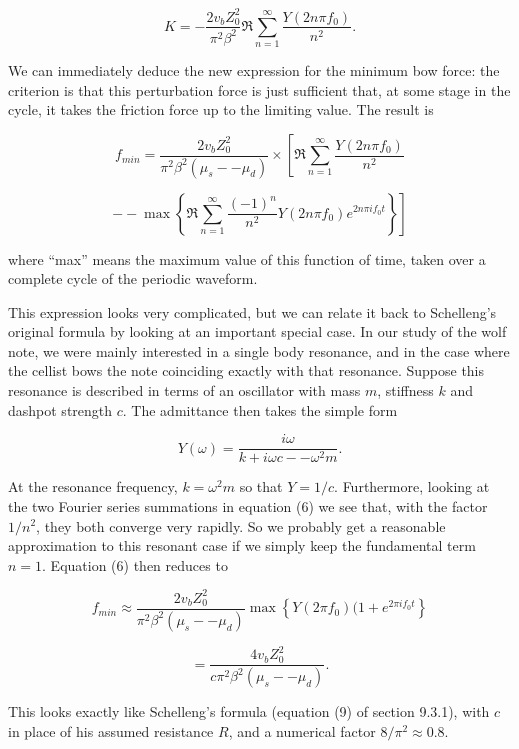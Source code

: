   \begin{equation*}K=-\dfrac{2 v_b Z^2_0}{\pi^2 \beta^2}\Re 
  \sum_{n=1}^\infty{\dfrac{Y(2 n \pi f_0)}{n^2} } . \tag{5}\end{equation*} 

  We can immediately deduce the new expression for the minimum bow force: the 
  criterion is that this perturbation force is just sufficient that, at some 
  stage in the cycle, it takes the friction force up to the limiting value. The 
  result is 

  \begin{equation*}f_{min}=\dfrac{2 v_b Z^2_0}{\pi^2 \beta^2 (\mu_s -- \mu_d)} 
  \times \left[ \Re \sum_{n=1}^\infty{\dfrac{Y(2 n \pi f_0)}{n^2} } 
  \right.\end{equation*} 

  \begin{equation*}\left. -- \max \left\lbrace 
  \Re\sum_{n=1}^\infty{\dfrac{(-1)^n }{n^2} Y(2 n \pi f_0) e^{2n \pi i f_0 t}} 
  \right\rbrace \right] \tag{6}\end{equation*} 

  \noindent{}where ``max'' means the maximum value of this function of time, 
  taken over a complete cycle of the periodic waveform. 

  This expression looks very complicated, but we can relate it back to 
  Schelleng's original formula by looking at an important special case. In our 
  study of the wolf note, we were mainly interested in a single body resonance, 
  and in the case where the cellist bows the note coinciding exactly with that 
  resonance. Suppose this resonance is described in terms of an oscillator with 
  mass $m$, stiffness $k$ and dashpot strength $c$. The admittance then takes 
  the simple form 

  \begin{equation*}Y(\omega)=\frac{i \omega}{k + i \omega c -- \omega^2 m} . 
  \tag{7}\end{equation*} 

  At the resonance frequency, $k=\omega^2 m$ so that $Y=1/c$. Furthermore, 
  looking at the two Fourier series summations in equation (6) we see that, 
  with the factor $1/n^2$, they both converge very rapidly. So we probably get 
  a reasonable approximation to this resonant case if we simply keep the 
  fundamental term $n=1$. Equation (6) then reduces to 

  \begin{equation*}f_{min} \approx \dfrac{2 v_b Z^2_0}{\pi^2 \beta^2 (\mu_s -- 
  \mu_d)} \max \left\lbrace Y(2 \pi f_0) (1+e^{2 \pi i f_0 t} 
  \right\rbrace\end{equation*} 

  \begin{equation*} = \dfrac{4 v_b Z^2_0}{c \pi^2 \beta^2 (\mu_s -- \mu_d)} . 
  \tag{8}\end{equation*} 

  This looks exactly like Schelleng's formula (equation (9) of section 9.3.1), 
  with $c$ in place of his assumed resistance $R$, and a numerical factor 
  $8/\pi^2 \approx 0.8$. 